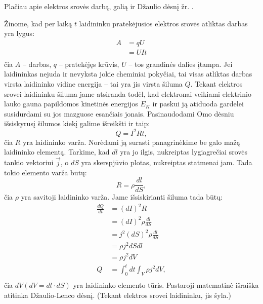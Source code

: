 Plačiau apie elektros srovės darbą, galią ir Džaulio dėsnį
žr. \cite[48p.]{elektra-magnetizmas}.

Žinome, kad per laiką $t$ laidininku pratekėjusios elektros srovės
atliktas darbas yra lygus:
\begin{align*}
  A
  &= qU \\
  &= UIt \\
\end{align*}
čia $A$ – darbas, $q$ – pratekėjęs krūvis, $U$ – tos grandinės dalies
įtampa. Jei laidininkas nejuda ir nevyksta jokie cheminiai pokyčiai,
tai visas atliktas darbas virsta laidininko vidine energija – tai
yra jis virsta šiluma $Q$. Tekant elektros srovei laidininku šiluma jame
atsiranda todėl, kad elektronai veikiami elektrinio lauko gauna
papildomos kinetinės energijos $E_{K}$ ir paskui ją atiduoda gardelei
susidurdami su jos mazguose esančiais jonais. Pasinaudodami
Omo dėsniu išsiskyrusį šilumos kiekį galime išreikšti ir taip:
\begin{equation*}
  Q = I^{2}Rt,
\end{equation*}
čia $R$ yra laidininko varža. Norėdami ją surasti panagrinėkime be
galo mažą laidininko elementą. Tarkime, kad $dl$ yra jo ilgis,
nukreiptas lygiagrečiai srovės tankio vektoriui $\vec{j}$, o
$dS$ yra skerspjūvio plotas, nukreiptas statmenai jam. Tada
tokio elemento varža būtų:
\begin{equation*}
  R = \rho \frac{dl}{dS},
\end{equation*}
čia $\rho$ yra savitoji laidininko varža. Jame išsiskirianti šiluma
tada būtų:
\begin{align*}
  \frac{dQ}{dt}
  &= \left( d I \right)^{2}R \\
  &= \left( d I \right)^{2}\rho\frac{dl}{dS} \\
  &= j^{2}\left( d S \right)^{2} \rho \frac{dl}{dS} \\
  &= \rho j^{2} dS dl \\
  &= \rho j^{2} dV \\
  Q
  &= \int _{0}^{t} dt \int _{V} \rho j^{2} dV, \\
\end{align*}
čia $dV (dV = dl \cdot dS)$ yra laidininko elemento tūris.
Pastaroji matematinė išraiška atitinka Džaulio-Lenco dėsnį.
(Tekant elektros srovei laidininku, jis šyla.)

